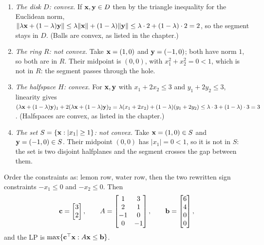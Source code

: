 \begin{enumerate}
\item \emph{The disk $D$: convex.} If $\mathbf{x}, \mathbf{y} \in D$ then by the triangle inequality for the Euclidean norm, $\|\lambda \mathbf{x} + (1-\lambda)\mathbf{y}\| \leq \lambda\|\mathbf{x}\| + (1-\lambda)\|\mathbf{y}\| \leq \lambda\cdot 2 + (1-\lambda)\cdot 2 = 2$, so the segment stays in $D$. (Balls are convex, as listed in the chapter.)
\item \emph{The ring $R$: not convex.} Take $\mathbf{x} = (1, 0)$ and $\mathbf{y} = (-1, 0)$; both have norm $1$, so both are in $R$. Their midpoint is $(0,0)$, with $x_1^2 + x_2^2 = 0 < 1$, which is not in $R$: the segment passes through the hole.
\item \emph{The halfspace $H$: convex.} For $\mathbf{x}, \mathbf{y}$ with $x_1 + 2x_2 \leq 3$ and $y_1 + 2y_2 \leq 3$, linearity gives $(\lambda \mathbf{x} + (1-\lambda)\mathbf{y})_1 + 2(\lambda \mathbf{x} + (1-\lambda)\mathbf{y})_2 = \lambda(x_1 + 2x_2) + (1-\lambda)(y_1 + 2y_2) \leq \lambda\cdot 3 + (1-\lambda)\cdot 3 = 3$. (Halfspaces are convex, as listed in the chapter.)
\item \emph{The set $S = \{\mathbf{x} : |x_1| \geq 1\}$: not convex.} Take $\mathbf{x} = (1, 0) \in S$ and $\mathbf{y} = (-1, 0) \in S$. Their midpoint $(0,0)$ has $|x_1| = 0 < 1$, so it is not in $S$: the set is two disjoint halfplanes and the segment crosses the gap between them.
\end{enumerate}

Order the constraints as: lemon row, water row, then the two rewritten sign constraints $-x_1 \leq 0$ and $-x_2 \leq 0$. Then
\[
\mathbf{c} = \begin{bmatrix} 3 \\ 2 \end{bmatrix}, \qquad
A = \begin{bmatrix} 1 & 3 \\ 2 & 1 \\ -1 & 0 \\ 0 & -1 \end{bmatrix}, \qquad
\mathbf{b} = \begin{bmatrix} 6 \\ 4 \\ 0 \\ 0 \end{bmatrix},
\]
and the LP is $\max\{ \mathbf{c}^\top \mathbf{x} : A\mathbf{x} \leq \mathbf{b} \}$.


